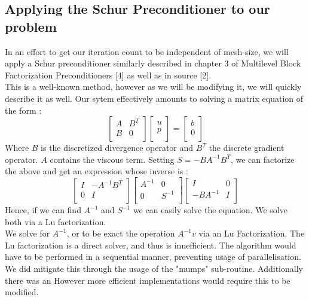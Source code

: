 \documentclass[11pt,twoside,a4paper]{article}
\begin{document}
\subsection{Applying the Schur Preconditioner to our problem}
In an effort to get our iteration count to be independent of mesh-size, we will apply a Schur preconditioner similarly described in chapter 3 of Multilevel Block Factorization Preconditioners [4] as well as in source [2].\\
This is a well-known method, however as we will be modifying it, we will quickly describe it as well.
Our sytem effectively amounts to solving a matrix equation of the form :
$$ 
\begin{bmatrix} 
A         & B^{T}\\
B         & 0 \\
\end{bmatrix}
\begin{bmatrix} 
u    \\
p     \\  
\end{bmatrix}
=
\begin{bmatrix} 
b    \\
0     \\  
\end{bmatrix}
$$
Where $B$ is the discretized divergence operator and $B^T$ the discrete gradient operator. $A$ contains the viscous term.
Setting $S = - B A^{-1} B^{T}$, we can factorize the above and get an expression whose inverse is : 
$$
\begin{bmatrix} 
I         & - A^{-1} B^{T}\\
0         & I \\
\end{bmatrix}
\begin{bmatrix} 
A^{-1}   & 0\\
0       & S^{-1} \\
\end{bmatrix}
\begin{bmatrix} 
I & 0\\
 - B A^{-1}       & I \\
\end{bmatrix}
$$
Hence, if we can find $A^{-1}$ and $S^{-1}$ we can easily solve the equation. We solve both via a Lu factorization.\\
We solve for $A^{-1}$, or to be exact the operation $A^{-1}v$ via an Lu Factorization. The Lu factorization is a direct solver, and thus is innefficient. The algorithm would have to be performed in a sequential manner, preventing usage of parallelisation. We did mitigate this through the usage of the "mumps" sub-routine. Additionally there was an  However more efficient implementations would require this to be modified.\\
\end{document}
